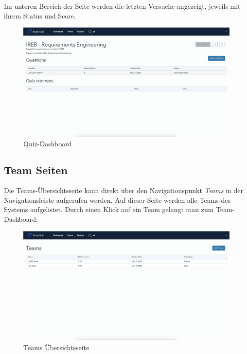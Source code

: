 \noindent Im unteren Bereich der Seite werden die letzten Versuche angezeigt, jeweils mit ihrem Status und Score.


\begin{figure}[H]
  \includegraphics[width=\linewidth]{img/quiz-detail.png}
  \caption{Quiz-Dashboard}
  \label{fig:quiz}
\end{figure}


\subsection*{Team Seiten}

Die Teams-Übersichtsseite kann direkt über den Navigationspunkt \textit{Teams} in der 
Navigationsleiste aufgerufen werden. Auf dieser Seite werden alle Teams des Systems aufgelistet.
Durch einen Klick auf ein Team gelangt man zum Team-Dashboard.

\begin{figure}[H]
  \includegraphics[width=\linewidth]{img/team-list.png}
  \caption{Teams Übersichtsseite}
  \label{fig:team}
\end{figure}

